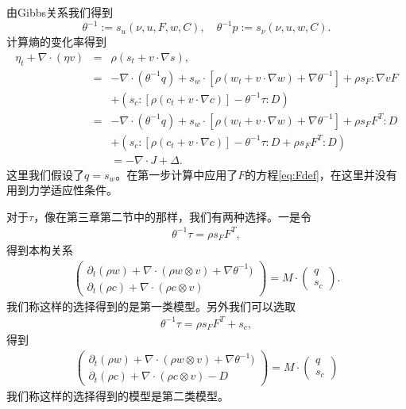 由Gibbs关系我们得到
$$\theta^{-1}:=s_{u} (\nu,u,F, w,C), \quad \theta^{-1} p := s_\nu (\nu,u,w,C).$$
计算熵的变化率得到
\begin{eqnarray*}
		\eta_t + \nabla \cdot (\eta v) &=& \rho (s_t + v \cdot \nabla s), \\
		&=& -\nabla \cdot (\theta^{-1} q) + s_w \cdot [\rho (w_t + v \cdot \nabla w) + \nabla \theta^{-1}] + \rho s_F : \nabla v F  \\
		&& + (s_c:[\rho (c_t + v \cdot \nabla c)] - \theta^{-1} \tau : D) \\
		&=& -\nabla \cdot (\theta^{-1} q) + s_w \cdot [\rho (w_t + v \cdot \nabla w)+\nabla \theta^{-1}] + \rho s_F F^T : D  \\
		&& + (s_c:[\rho (c_t + v \cdot \nabla c)] - \theta^{-1} \tau : D + \rho s_F F^T : D)  \\
		&& = -\nabla \cdot J + \Delta.
\end{eqnarray*}
这里我们假设了$q=s_w$。在第一步计算中应用了$F$的方程\eqref{eq:Fdef}，在这里并没有用到力学适应性条件。

对于$\tau$，像在第三章第二节中的那样，我们有两种选择。一是令
\begin{eqnarray*}
\theta^{-1} \tau = \rho s_F F^T ,
\end{eqnarray*}
得到本构关系
\begin{eqnarray}\label{eq:finite1}
\left( \begin{array}{c} \partial_t (\rho w) + \nabla \cdot (\rho w \otimes v) + \nabla \theta^{-1}) \\
	\partial_t (\rho c) + \nabla \cdot (\rho c \otimes v) \end{array} \right)
=
M \cdot \left( \begin{array}{c} q \\ s_c \end{array} \right).
\end{eqnarray}
我们称这样的选择得到的是第一类模型。另外我们可以选取
\begin{eqnarray*}
	\theta^{-1} \tau = \rho s_F F^T + s_c,
\end{eqnarray*}
得到
\begin{eqnarray}\label{eq:finite2}
\left( \begin{array}{c} \partial_t (\rho w) + \nabla \cdot (\rho w \otimes v) + \nabla \theta^{-1}) \\
	\partial_t (\rho c) + \nabla \cdot (\rho c \otimes v) - D \end{array} \right)
=
M \cdot \left( \begin{array}{c} q \\ s_c  \end{array} \right)
\end{eqnarray}
我们称这样的选择得到的模型是第二类模型。

